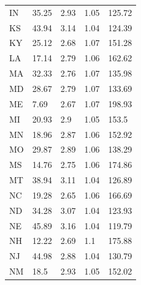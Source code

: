 \documentclass{article}
\begin{document}
\begin{table}
\begin{tabular}{p{1in}p{1in}p{1in}p{1in}p{1in}}
	IN    & 35.25                       & 2.93                 & 1.05         & 125.72                    \\
	KS    & 43.94                       & 3.14                 & 1.04         & 124.39                    \\
	KY    & 25.12                       & 2.68                 & 1.07         & 151.28                    \\
	LA    & 17.14                       & 2.79                 & 1.06         & 162.62                    \\
	MA    & 32.33                       & 2.76                 & 1.07         & 135.98                    \\
	MD    & 28.67                       & 2.79                 & 1.07         & 133.69                    \\
	ME    & 7.69                        & 2.67                 & 1.07         & 198.93                    \\
	MI    & 20.93                       & 2.9                  & 1.05         & 153.5                     \\
	MN    & 18.96                       & 2.87                 & 1.06         & 152.92                    \\
	MO    & 29.87                       & 2.89                 & 1.06         & 138.29                    \\
	MS    & 14.76                       & 2.75                 & 1.06         & 174.86                    \\
	MT    & 38.94                       & 3.11                 & 1.04         & 126.89                    \\
	NC    & 19.28                       & 2.65                 & 1.06         & 166.69                    \\
	ND    & 34.28                       & 3.07                 & 1.04         & 123.93                    \\
	NE    & 45.89                       & 3.16                 & 1.04         & 119.79                    \\
	NH    & 12.22                       & 2.69                 & 1.1          & 175.88                    \\
	NJ    & 44.98                       & 2.88                 & 1.04         & 130.79                    \\
	NM    & 18.5                        & 2.93                 & 1.05         & 152.02                    \\

\end{tabular}
\end{table}
\end{document}
